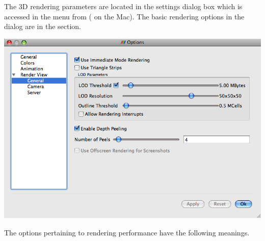The 3D rendering parameters are located in the settings dialog box which is
accessed in the menu from  \ra {} ( \ra
{} on the Mac).  The basic rendering options in the dialog
are in the  \ra {} section.

\begin{inlinefig}
  \includegraphics[width=\scw]{images/SettingsRendering}
\end{inlinefig}

The options pertaining to rendering performance have the following
meanings.

